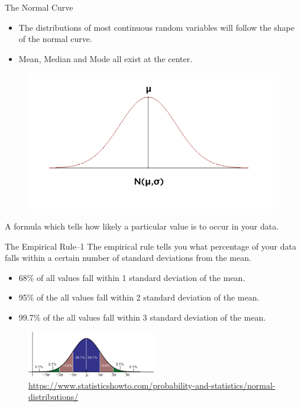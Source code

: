 \documentclass[10pt,dvipsnames, aspectratio=169]{beamer}
\begin{document}
\begin{frame}[t]{The Normal Curve}
	\begin{itemize}
		\item The distributions of most continuous random variables will follow 
		the shape of the normal curve.
		\item Mean, Median and Mode all exist at the center.
		
	\end{itemize}
	\begin{figure} [ht]
		\centering
		\includegraphics[trim={0 1cm 0 0}, clip, scale=0.4]{eda/nd3.png}
	\end{figure}
	\centering
	A formula which tells how likely a particular value is
	to occur in your data.
\end{frame}
\begin{frame}[t]{The Empirical Rule--1}
	The empirical rule tells you what percentage of your data falls within a 
	certain number of standard deviations from the mean.
	\begin{itemize}
		\item 68\% of all values fall within 1 standard deviation of the mean.
		\item 95\% of the all values fall within 2 standard deviation of the 
		mean. 
		\item 99.7\% of the all values fall within 3 standard deviation of the 
		mean. 
	\end{itemize}
	
	\begin{figure} [ht]
		\centering
		\includegraphics[width=0.5\textwidth]{eda/standard-normal-distribution.jpg}
		\caption{\url{https://www.statisticshowto.com/probability-and-statistics/normal-distributions/}}
	\end{figure}
\end{frame}
\end{document}
